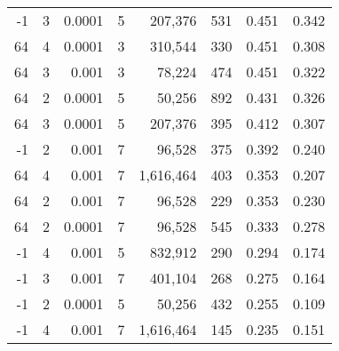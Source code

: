 \begin{table}[h]
\begin{tabular}{rrrrrrrr}
-1 & 3 & 0.0001 & 5 & 207,376 & 531 & 0.451 & 0.342 \\
64 & 4 & 0.0001 & 3 & 310,544 & 330 & 0.451 & 0.308 \\
64 & 3 & 0.001 & 3 & 78,224 & 474 & 0.451 & 0.322 \\
64 & 2 & 0.0001 & 5 & 50,256 & 892 & 0.431 & 0.326 \\
64 & 3 & 0.0001 & 5 & 207,376 & 395 & 0.412 & 0.307 \\
-1 & 2 & 0.001 & 7 & 96,528 & 375 & 0.392 & 0.240 \\
64 & 4 & 0.001 & 7 & 1,616,464 & 403 & 0.353 & 0.207 \\
64 & 2 & 0.001 & 7 & 96,528 & 229 & 0.353 & 0.230 \\
64 & 2 & 0.0001 & 7 & 96,528 & 545 & 0.333 & 0.278 \\
-1 & 4 & 0.001 & 5 & 832,912 & 290 & 0.294 & 0.174 \\
-1 & 3 & 0.001 & 7 & 401,104 & 268 & 0.275 & 0.164 \\
-1 & 2 & 0.0001 & 5 & 50,256 & 432 & 0.255 & 0.109 \\
-1 & 4 & 0.001 & 7 & 1,616,464 & 145 & 0.235 & 0.151 \\
\bottomrule
\end{tabular}

\normalsize
\end{table}
